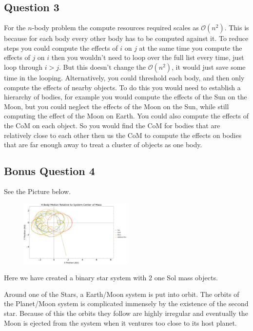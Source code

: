 \documentclass{article}
\begin{document}
\subsection{Question 3}
For the $n$-body problem the compute resources required scales as $\mathcal{O}(n^2)$. This is because for each body every other body has to be computed against it. To reduce steps you could compute the effects of $i$ on $j$ at the same time you compute the effects of $j$ on $i$ then you wouldn't need to loop over the full list every time, just loop through  $i>j$. But this doesn't change the  $\mathcal{O}(n^2)$, it would just save some time in the looping. Alternatively, you could threshold each body, and then only compute the effects of nearby objects. To do this you would need to establish a hierarchy of bodies, for example you would compute the effects of the Sun on the Moon, but you could neglect the effects of the Moon on the Sun, while still computing the effect of the Moon on Earth. You could also compute the effects of the CoM on each object. So you would find the CoM for bodies that are relatively close to each other then us the CoM to compute the effects on bodies that are far enough away to treat a cluster of objects as one body.

\subsection{Bonus Question 4}

See the Picture below.

\begin{figure}[!htb]
	\begin{center}
		\includegraphics[width=0.5\textwidth]{p4-1a.pdf}
	\end{center}
	\caption{}
\label{fig:qual}
\end{figure}
\FloatBarrier

Here we have created a binary star system with 2 one Sol mass objects. 

Around one of the Stars, a Earth/Moon system is put into orbit. The orbits of the Planet/Moon system is complicated immensely by the existence of the second star. Because of this the orbits they follow are highly irregular and eventually the Moon is ejected from the system when it ventures too close to its host planet.
\end{document}
